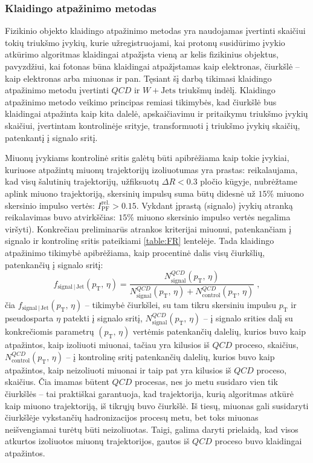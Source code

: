 \documentclass[a4paper, 12pt, oneside]{article}
\newcommand{\pT}{p_{\mathrm{T}}}
\newcommand{\WJets}{W\! +\!\mathrm{Jets}}
\newcommand{\QCD}{QC\! D}
\newlength\q
\begin{document}
\subsubsection{Klaidingo atpažinimo metodas}

Fizikinio objekto klaidingo atpažinimo metodas yra naudojamas įvertinti skaičiui tokių triukšmo įvykių, kurie užregistruojami,
kai protonų susidūrimo įvykio atkūrimo algoritmas klaidingai atpažįsta vieną ar kelis fizikinius objektus, pavyzdžiui, kai fotonas
būna klaidingai atpažįstamas kaip elektronas, čiurkšlė -- kaip elektronas arba miuonas ir pan.
Tęsiant šį darbą tikimasi klaidingo atpažinimo metodu įvertinti $\QCD$ ir $\WJets$ triukšmų indėlį.
Klaidingo atpažinimo metodo veikimo principas remiasi tikimybės, kad čiurkšlė bus klaidingai atpažinta kaip kita dalelė,
apskaičiavimu ir pritaikymu triukšmo įvykių skaičiui, įvertintam kontrolinėje srityje, transformuoti į triukšmo įvykių skaičių,
patenkantį į signalo sritį.

Miuonų įvykiams kontrolinė sritis galėtų būti apibrėžiama kaip tokie įvykiai, kuriuose atpažintų miuonų trajektorijų izoliuotumas yra prastas:
reikalaujama, kad visų šalutinių trajektorijų, užfiksuotų $\Delta R < 0.3$ pločio kūgyje, nubrėžtame aplink miuono trajektoriją,
skersinių impulsų suma būtų didesnė už $15\%$ miuono skersinio impulso vertės: $I_{\mathrm{PF}}^{\mathrm{rel.}}>0.15$.
Vykdant įprastą (signalo) įvykių atranką reikalavimas buvo atvirkščias: $15\%$ miuono skersinio impulso vertės negalima viršyti).
Konkrečiau preliminarūs atrankos kriterijai miuonui, patenkančiam į signalo ir kontrolinę sritis pateikiami \ref{table:FR} lentelėje.
Tada klaidingo atpažinimo tikimybė apibrėžiama, kaip procentinė dalis visų čiurkšlių, patenkančių į signalo sritį:
\begin{equation}
	f_{\mathrm{signal} \,| \,\mathrm{Jet}}(\pT, \, \eta) =
	\frac{N^{\QCD}_{\mathrm{signal}}(\pT, \, \eta)}{N^{\QCD}_{\mathrm{signal}}(\pT, \, \eta)+N^{\QCD}_{\mathrm{control}}(\pT, \, \eta)} \; ,
\end{equation}
čia $f_{\mathrm{signal} \,| \,\mathrm{Jet}}(\pT, \, \eta)$ -- tikimybė čiurkšlei, su tam tikru skersiniu impulsu $\pT$ ir pseudosparta $\eta$
patekti į signalo sritį, $N^{\QCD}_{\mathrm{signal}}(\pT, \, \eta)$ -- į signalo srities dalį su konkrečiomis parametrų $(\pT, \, \eta)$
vertėmis patenkančių dalelių, kurios buvo kaip atpažintos, kaip izoliuoti miuonai, tačiau yra kilusios iš $\QCD$ proceso, skaičius,
$N^{\QCD}_{\mathrm{control}}(\pT, \, \eta)$ -- į kontrolinę sritį patenkančių dalelių, kurios buvo kaip atpažintos, kaip neizoliuoti
miuonai ir taip pat yra kilusios iš $\QCD$ proceso, skaičius.
Čia imamas būtent $\QCD$ procesas, nes jo metu susidaro vien tik čiurkšlės -- tai praktiškai garantuoja, kad trajektorija, kurią
algoritmas atkūrė kaip miuono trajektoriją, iš tikrųjų buvo čiurkšlė.
Iš tiesų, miuonas gali susidaryti čiurkšlėje vykstančių hadronizacijos procesų metu, bet toks miuonas neišvengiamai turėtų būti
neizoliuotas.
Taigi, galima daryti prielaidą, kad visos atkurtos izoliuotos miuonų trajektorijos, gautos iš $\QCD$ proceso buvo klaidingai atpažintos.
\end{document}
